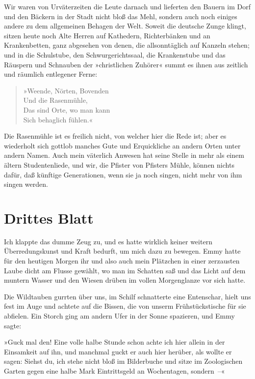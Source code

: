 Wir waren von Urväterzeiten die Leute darnach und lieferten den
Bauern im Dorf und den Bäckern in der Stadt nicht bloß das Mehl,
sondern auch noch einiges andere zu dem allgemeinen Behagen der
Welt. Soweit die deutsche Zunge klingt, sitzen heute noch Alte
Herren auf Kathedern, Richterbänken und an Krankenbetten, ganz
abgesehen von denen, die allsonntäglich auf Kanzeln stehen; und in
die Schulstube, den Schwurgerichtssaal, die Krankenstube und das
Räuspern und Schnauben der »christlichen Zuhörer« summt es ihnen
aus zeitlich und räumlich entlegener Ferne:

\begin{verse}
»Weende, Nörten, Bovenden\\
Und die Rasenmühle,\\
Das sind Orte, wo man kann\\
Sich behaglich fühlen.«
\end{verse}

Die Rasenmühle ist es freilich nicht, von welcher hier die Rede
ist; aber es wiederholt sich gottlob manches Gute und Erquickliche
an andern Orten unter andern Namen. Auch mein väterlich Anwesen hat
seine Stelle in mehr als einem ältern Studentenliede, und wir, die
Pfister von Pfisters Mühle, können nichts dafür, daß künftige
Generationen, wenn sie ja noch singen, nicht mehr von ihm singen
werden.

\section{Drittes Blatt}

Ich klappte das dumme Zeug zu, und es hatte wirklich keiner weitern
Überredungskunst und Kraft bedurft, um mich dazu zu bewegen. Emmy
hatte für den heutigen Morgen ihr und also auch mein Plätzchen in
einer zerzausten Laube dicht am Flusse gewählt, wo man im Schatten
saß und das Licht auf dem muntern Wasser und den Wiesen drüben im
vollen Morgenglanze vor sich hatte.

Die Wildtauben gurrten über uns, im Schilf schnatterte eine
Entenschar, hielt uns fest im Auge und achtete auf die Bissen, die
von unserm Frühstückstische für sie abfielen. Ein Storch ging am
andern Ufer in der Sonne spazieren, und Emmy sagte:

»Guck mal den! Eine volle halbe Stunde schon achte ich hier allein
in der Einsamkeit auf ihn, und manchmal guckt er auch hier herüber,
als wollte er sagen: Siehst du, ich stehe nicht bloß im Bilderbuche
und sitze im Zoologischen Garten gegen eine halbe Mark
Eintrittsgeld an Wochentagen, sondern~–«

